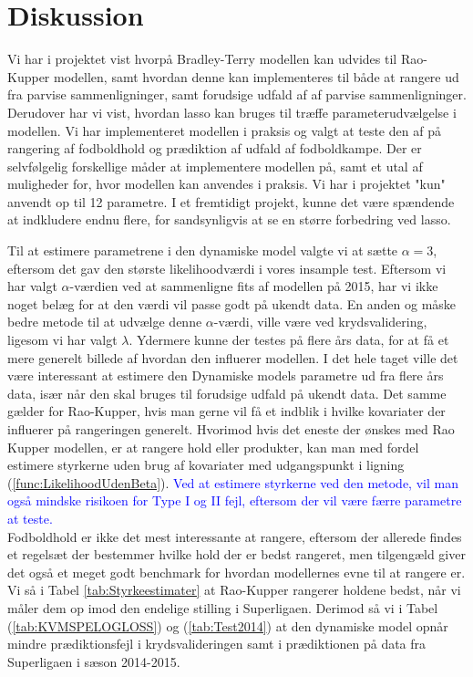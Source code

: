 \documentclass[11pt,a4paper]{article}
\begin{document}
\section{Diskussion}
Vi har i projektet vist hvorpå Bradley-Terry modellen kan udvides til Rao-Kupper modellen, samt hvordan denne kan implementeres til både at rangere ud fra parvise sammenligninger, samt forudsige udfald af af parvise sammenligninger. Derudover har vi vist, hvordan lasso kan bruges til træffe parameterudvælgelse i modellen. Vi har implementeret modellen i praksis og valgt at teste den af på rangering af fodboldhold og prædiktion af udfald af fodboldkampe. Der er selvfølgelig forskellige måder at implementere modellen på, samt et utal af muligheder for, hvor modellen kan anvendes i praksis. Vi har i projektet "kun" anvendt op til 12 parametre. I et fremtidigt projekt, kunne det være spændende at indkludere endnu flere, for sandsynligvis at se en større forbedring ved lasso.\par
Til at estimere parametrene i den dynamiske model valgte vi at sætte $\alpha=3$, eftersom det gav den største likelihoodværdi i vores insample test. Eftersom vi har valgt $\alpha$-værdien ved at sammenligne fits af modellen på 2015, har vi ikke noget belæg for at den værdi vil passe godt på ukendt data. En anden og måske bedre metode til at udvælge denne $\alpha$-værdi, ville være ved krydsvalidering, ligesom vi har valgt $\lambda$. Ydermere kunne der testes på flere års data, for at få et mere generelt billede af hvordan den influerer modellen. I det hele taget ville det være interessant at estimere den Dynamiske models parametre ud fra flere års data, især når den skal bruges til forudsige udfald på ukendt data. Det samme gælder for Rao-Kupper, hvis man gerne vil få et indblik i hvilke kovariater der influerer på rangeringen generelt. Hvorimod hvis det eneste der ønskes med Rao Kupper modellen, er at rangere hold eller produkter, kan man med fordel estimere styrkerne uden brug af kovariater med udgangspunkt i ligning (\ref{func:LikelihoodUdenBeta}). \textcolor{blue}{Ved at estimere styrkerne ved den metode, vil man også mindske risikoen for Type I og II fejl, eftersom der vil være færre parametre at teste.} \\ \newline 
Fodboldhold er ikke det mest interessante at rangere, eftersom der allerede findes et regelsæt der bestemmer hvilke hold der er bedst rangeret, men tilgengæld giver det også et meget godt benchmark for hvordan modellernes evne til at rangere er. Vi så i Tabel \ref{tab:Styrkeestimater} at Rao-Kupper rangerer holdene bedst, når vi måler dem op imod den endelige stilling i Superligaen. Derimod så vi i Tabel (\ref{tab:KVMSPELOGLOSS}) og (\ref{tab:Test2014}) at den dynamiske model opnår mindre prædiktionsfejl i krydsvalideringen samt i prædiktionen på data fra Superligaen i sæson 2014-2015.\\
\end{document}
